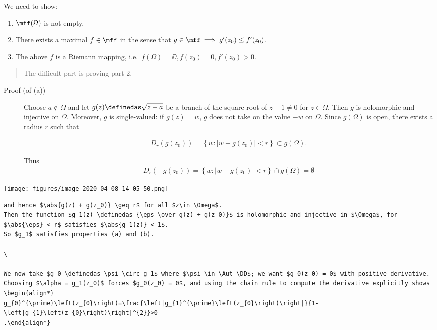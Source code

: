 We need to show:

\begin{enumerate}
\def\labelenumi{\arabic{enumi}.}
\tightlist
\item
  \(\mff(\Omega)\) is not empty.
\item
  There exists a maximal \(f \in \mff\) in the sense that
  \(g\in \mff \implies g'(z_0) \leq f'(z_0)\).
\item
  The above \(f\) is a Riemann mapping,
  i.e.~\(f(\Omega) = \DD, f(z_0) = 0, f'(z_0) > 0\).
\end{enumerate}

\begin{quote}
The difficult part is proving part 2.
\end{quote}

\begin{description}
\item[Proof (of (a))]
Choose \(a\not\in \Omega\) and let \(g(z) \definedas \sqrt{z-a}\) be a
branch of the square root of \(z-1\neq 0\) for \(z\in \Omega\). Then
\(g\) is holomorphic and injective on \(\Omega\). Moreover, \(g\) is
single-valued: if \(g(z) = w\), \(g\) does not take on the value \(-w\)
on \(\Omega\). Since \(g(\Omega)\) is open, there exists a radius \(r\)
such that

\begin{align*}
D_{r}\left(g\left(z_{0}\right)\right)=\left\{w:\left|w-g\left(z_{0}\right)\right|<r\right\} \subset g(\Omega)
.\end{align*}

Thus \begin{align*}
D_{r}\left(-g\left(z_{0}\right)\right)=\left\{w:\left|w+g\left(z_{0}\right)\right|<r\right\} \cap g(\Omega)=\emptyset
\end{align*}
\end{description}

\texttt{[image: figures/image\_2020-04-08-14-05-50.png]}\\

\begin{verbatim}
and hence $\abs{g(z) + g(z_0)} \geq r$ for all $z\in \Omega$.
Then the function $g_1(z) \definedas {\eps \over g(z) + g(z_0)}$ is holomorphic and injective in $\Omega$, for $\abs{\eps} < r$ satisfies $\abs{g_1(z)} < 1$.
So $g_1$ satisfies properties (a) and (b).

\

We now take $g_0 \definedas \psi \circ g_1$ where $\psi \in \Aut \DD$; we want $g_0(z_0) = 0$ with positive derivative.
Choosing $\alpha = g_1(z_0)$ forces $g_0(z_0) = 0$, and using the chain rule to compute the derivative explicitly shows
\begin{align*}
g_{0}^{\prime}\left(z_{0}\right)=\frac{\left|g_{1}^{\prime}\left(z_{0}\right)\right|}{1-\left|g_{1}\left(z_{0}\right)\right|^{2}}>0
.\end{align*}
\end{verbatim}

